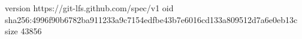 version https://git-lfs.github.com/spec/v1
oid sha256:4996f90b6782ba911233a9c7154edfbe43b7e6016cd133a809512d7a6e0eb13c
size 43856
